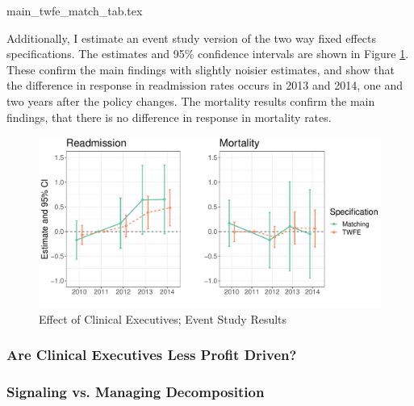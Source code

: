 \documentclass[12pt]{article}
\begin{document}
{main_twfe_match_tab.tex}

Additionally, I estimate an event study version of the two way fixed effects specifications. The estimates and 95\% confidence intervals are shown in Figure \ref{fig:main_twfe_match_es}. These confirm the main findings with slightly noisier estimates, and show that the difference in response in readmission rates occurs in 2013 and 2014, one and two years after the policy changes. The mortality results confirm the main findings, that there is no difference in response in mortality rates. 

\begin{figure}[ht!]
    \centering
    \includegraphics[width=.99\linewidth]{Objects/main_twfe_match_eventstudy.pdf}
    \caption{Effect of Clinical Executives; Event Study Results}
    \label{fig:main_twfe_match_es}
\end{figure}


\subsubsection{Are Clinical Executives Less Profit Driven?}

\subsubsection{Signaling vs. Managing Decomposition}



    

    

    

    

    

    

	
	
	
\end{document}
